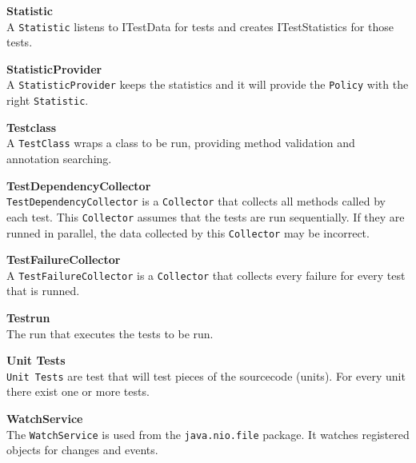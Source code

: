 \documentclass[i2]{oss}
\newcommand{\class}[1]{\texttt{#1}}
\newcommand{\gloss}[1]{\textbf{#1}}
\begin{document}
\begin{description}
\item \gloss{Statistic} \\
A \class{Statistic} listens to ITestData for tests and creates ITestStatistics for those tests.

\item \gloss{StatisticProvider} \\
A \class{StatisticProvider} keeps the statistics and it will provide the \class{Policy} with the right \class{Statistic}.

\item \gloss{Testclass} \\
 A \class{TestClass} wraps a class to be run, providing method validation and annotation searching.

\item \gloss{TestDependencyCollector} \\
\class{TestDependencyCollector} is a \class{Collector} that collects all methods called by each test. This \class{Collector} assumes that the tests are run sequentially. If they are runned in parallel, the data collected by this \class{Collector} may be incorrect.

\item \gloss{TestFailureCollector} \\
A \class{TestFailureCollector} is a \class{Collector} that collects every failure for every test that is runned.


\item \gloss{Testrun} \\ 
	The run that executes the tests to be run.


\item \gloss{Unit Tests} \\
\class{Unit Tests} are test that will test pieces of the sourcecode (units). For every unit there exist one or more tests. 

\item \gloss{WatchService} \\
The \class{WatchService} is used from the \class{java.nio.file} package. It watches registered objects for changes and events.

\end{description}
\end{document}
